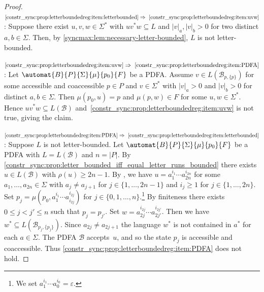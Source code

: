 \begin{proof}
	$\ref{constr_sync:prop:letterboundedreg:item:letterbounded} \Rightarrow~\ref{constr_sync:prop:letterboundedreg:item:uvw}$: Suppose there exist $u,v,w \in \Sigma^*$
	with $uv^*w \subseteq L$ and $|v|_a, |v|_b > 0$ for two distinct $a,b \in \Sigma$.
	Then, by \cref{syncmax:lem:necessary-letter-bounded}, $L$ is not letter-bounded.
	
	$\ref{constr_sync:prop:letterboundedreg:item:uvw}\Rightarrow~\ref{constr_sync:prop:letterboundedreg:item:PDFA}$: 
	Let  $\automat{B}{P}{\Sigma}{\mu}{p_0}{F}$
	be a PDFA.
	Assume  $v \in L(\mathcal B_{p, \{p\}})$
	for some  accessible and coaccessible $p \in P$ and 
	$v \in \Sigma^*$ with $|v|_a > 0$ and $|v|_b > 0$
	for distinct $a,b \in \Sigma$.
	Then
	$\mu(p_0, u) = p$
	and $\mu(p, w) \in F$ for some $u,w \in \Sigma^*$.
	Hence $uv^*w \subseteq L(\mathcal B)$
	and~\cref{constr_sync:prop:letterboundedreg:item:uvw} 
	is not true, giving the claim.	
%	
%	
	
	$\ref{constr_sync:prop:letterboundedreg:item:PDFA} \Rightarrow~\ref{constr_sync:prop:letterboundedreg:item:letterbounded}$:	
	Suppose $L$ is not letter-bounded.
	Let $\automat{B}{P}{\Sigma}{\mu}{p_0}{F}$
	be a PDFA with $L = L(\mathcal B)$ and $n = |P|$.
	By \cref{constr_sync:prop:letter_bounded_iff_equal_letter_runs_bounded}
	there exists $u \in L(\mathcal B)$
	with $\rho(u) \ge 2n - 1$.
	By ,
	we have $u = a_1^{i_1} \cdots a_{2n}^{i_{2n}}$
	for some $a_1, \ldots, a_{2n} \in \Sigma$ with $a_j \ne a_{j+1}$ for $j \in \{1,\ldots,2n-1\}$
	and $i_j \ge 1$ for $j \in \{1,\ldots,2n\}$.
	Set $p_j = \mu(p_0, a_1^{i_1} \cdots a_{i_{2j}}^{i_{2j}})$
	for $j \in \{0,1,\ldots,n\}$.\footnote{We set $a_1^{i_1} \cdots a_{0}^{i_{0}} = \varepsilon$.}
	By finiteness there exists $0 \le j < j' \le n$ such that $p_j = p_{j'}$.
	Set $w = a_{2j}^{i_{2j}} \cdots a_{2j'}^{i_{2j'}}$.
	Then we have $w^* \subseteq L(\mathcal B_{p_j, \{p_j\}})$.
	Since $a_{2j} \ne a_{2j+1}$ the language $w^*$ is not contained in $a^*$
	for each $a \in \Sigma$.
	The PDFA $\mathcal B$ accepts~$u$,
	and so the state $p_j$ is accessible and coaccessible.
	Thus \cref{constr_sync:prop:letterboundedreg:item:PDFA} does not hold.
\end{proof}